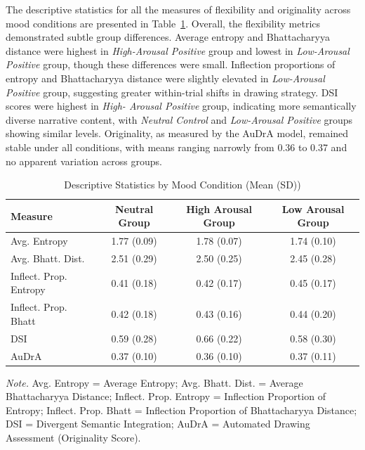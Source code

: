 \documentclass[../MA_Thesis.tex]{subfiles}
\begin{document}
The descriptive statistics for all the measures of flexibility and originality across mood conditions are presented in Table~\ref{tab:descriptive_stats}. Overall, the flexibility metrics demonstrated subtle group differences. Average entropy and Bhattacharyya distance were highest in \textit{High-Arousal Positive} group and lowest in \textit{Low-Arousal Positive} group, though these differences were small. Inflection proportions of entropy and Bhattacharyya distance were slightly elevated in \textit{Low-Arousal Positive} group, suggesting greater within-trial shifts in drawing strategy. DSI scores were highest in \textit{High- Arousal Positive} group, indicating more semantically diverse narrative content, with \textit{Neutral Control} and \textit{Low-Arousal Positive} groups showing similar levels. Originality, as measured by the AuDrA model, remained stable under all conditions, with means ranging narrowly from 0.36 to 0.37 and no apparent variation across groups. 

\begin{table}[H]
\centering
\begin{threeparttable}
\caption{Descriptive Statistics by Mood Condition (Mean (SD))}
\label{tab:descriptive_stats}
\begin{tabular}{lccc}
\toprule
\textbf{Measure} & \textbf{Neutral Group} & \textbf{High Arousal Group} & \textbf{Low Arousal Group} \\
\midrule
Avg. Entropy & 1.77 (0.09) & 1.78 (0.07) & 1.74 (0.10) \\
Avg. Bhatt. Dist. & 2.51 (0.29) & 2.50 (0.25) & 2.45 (0.28) \\
Inflect. Prop. Entropy & 0.41 (0.18) & 0.42 (0.17) & 0.45 (0.17) \\
Inflect. Prop. Bhatt & 0.42 (0.18) & 0.43 (0.16) & 0.44 (0.20) \\
DSI & 0.59 (0.28) & 0.66 (0.22) & 0.58 (0.30) \\
AuDrA & 0.37 (0.10) & 0.36 (0.10) & 0.37 (0.11) \\
\bottomrule
\end{tabular}
\begin{tablenotes}[flushleft]
\small
\item \textit{Note.} Avg. Entropy = Average Entropy; Avg. Bhatt. Dist. = Average Bhattacharyya Distance; Inflect. Prop. Entropy = Inflection Proportion of Entropy; Inflect. Prop. Bhatt = Inflection Proportion of Bhattacharyya Distance; DSI = Divergent Semantic Integration; AuDrA = Automated Drawing Assessment (Originality Score).
\end{tablenotes}
\end{threeparttable}
\end{table}
\end{document}
